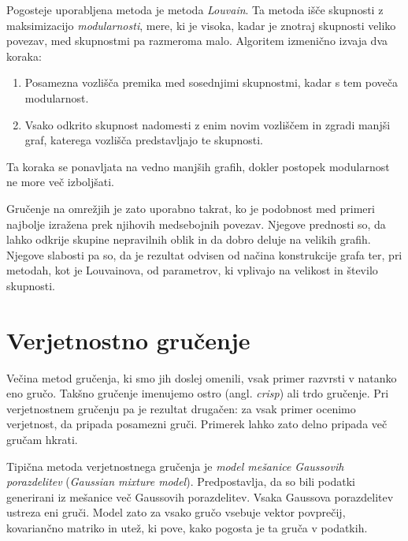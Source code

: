 Pogosteje uporabljena metoda je metoda {\em Louvain}. Ta metoda išče skupnosti z maksimizacijo {\em modularnosti}, mere, ki je visoka, kadar je znotraj skupnosti veliko povezav, med skupnostmi pa razmeroma malo. Algoritem izmenično izvaja dva koraka:
\begin{enumerate}
\item Posamezna vozlišča premika med sosednjimi skupnostmi, kadar s tem poveča modularnost.
\item Vsako odkrito skupnost nadomesti z enim novim vozliščem in zgradi manjši graf, katerega vozlišča predstavljajo te skupnosti.
\end{enumerate}
Ta koraka se ponavljata na vedno manjših grafih, dokler postopek modularnost ne more več izboljšati.

Gručenje na omrežjih je zato uporabno takrat, ko je podobnost med primeri najbolje izražena prek njihovih medsebojnih povezav. Njegove prednosti so, da lahko odkrije skupine nepravilnih oblik in da dobro deluje na velikih grafih. Njegove slabosti pa so, da je rezultat odvisen od načina konstrukcije grafa ter, pri metodah, kot je Louvainova, od parametrov, ki vplivajo na velikost in število skupnosti.

\section{Verjetnostno gručenje}

Večina metod gručenja, ki smo jih doslej omenili, vsak primer razvrsti v natanko eno gručo. Takšno gručenje imenujemo ostro (angl. {\em crisp}) ali trdo gručenje. Pri verjetnostnem gručenju pa je rezultat drugačen: za vsak primer ocenimo verjetnost, da pripada posamezni gruči. Primerek lahko zato delno pripada več gručam hkrati.

Tipična metoda verjetnostnega gručenja je {\em model mešanice Gaussovih porazdelitev} ({\em Gaussian mixture model}). Predpostavlja, da so bili podatki generirani iz mešanice več Gaussovih porazdelitev. Vsaka Gaussova porazdelitev ustreza eni gruči. Model zato za vsako gručo vsebuje vektor povprečij, kovariančno matriko in utež, ki pove, kako pogosta je ta gruča v podatkih.

